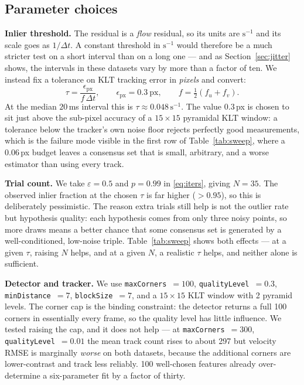 \documentclass[10pt]{article}
\begin{document}
\subsection{Parameter choices}

\textbf{Inlier threshold.} The residual is a \emph{flow} residual, so its units are $\mathrm{s}^{-1}$
and its scale goes as $1/\Delta t$. A constant threshold in $\mathrm{s}^{-1}$ would therefore be a
much stricter test on a short interval than on a long one --- and as Section~\ref{sec:jitter} shows,
the intervals in these datasets vary by more than a factor of ten. We instead fix a tolerance on KLT
tracking error in \emph{pixels} and convert:
\begin{equation}
\tau = \frac{\epsilon_{\text{px}}}{f\,\Delta t},\qquad \epsilon_{\text{px}} = 0.3\ \text{px},
\qquad f = \tfrac12(f_u+f_v).
\end{equation}
At the median $20\,$ms interval this is $\tau\approx0.048\,\mathrm{s}^{-1}$. The value $0.3\,$px is
chosen to sit just above the sub-pixel accuracy of a $15\times15$ pyramidal KLT window: a tolerance
below the tracker's own noise floor rejects perfectly good measurements, which is the failure mode
visible in the first row of Table~\ref{tab:sweep}, where a $0.06\,$px budget leaves a consensus set
that is small, arbitrary, and a worse estimator than using every track.

\textbf{Trial count.} We take $\varepsilon=0.5$ and $p=0.99$ in \eqref{eq:iters}, giving $N=35$. The
observed inlier fraction at the chosen $\tau$ is far higher ($>0.95$), so this is deliberately
pessimistic. The reason extra trials still help is not the outlier rate but hypothesis quality: each
hypothesis comes from only three noisy points, so more draws means a better chance that some
consensus set is generated by a well-conditioned, low-noise triple. Table~\ref{tab:sweep} shows both
effects --- at a given $\tau$, raising $N$ helps, and at a given $N$, a realistic $\tau$ helps, and
neither alone is sufficient.

\textbf{Detector and tracker.} We use \texttt{maxCorners}~$=100$, \texttt{qualityLevel}~$=0.3$,
\texttt{minDistance}~$=7$, \texttt{blockSize}~$=7$, and a $15\times15$ KLT window with 2 pyramid
levels. The corner cap is the binding constraint: the detector returns a full 100 corners in
essentially every frame, so the quality level has little influence. We tested raising the cap, and
it does not help --- at \texttt{maxCorners}~$=300$, \texttt{qualityLevel}~$=0.01$ the mean track
count rises to about 297 but velocity RMSE is marginally \emph{worse} on both datasets, because the
additional corners are lower-contrast and track less reliably. 100 well-chosen features already
over-determine a six-parameter fit by a factor of thirty.
\end{document}
